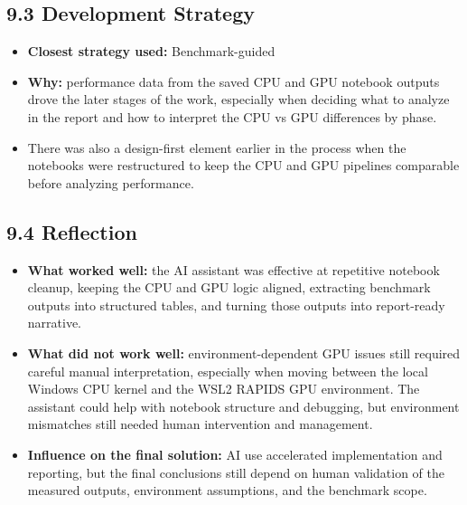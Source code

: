 \documentclass[10pt]{article}
\begin{document}
\subsection*{9.3 Development Strategy}
\begin{itemize}
  \item \textbf{Closest strategy used:} Benchmark-guided
  \item \textbf{Why:} performance data from the saved CPU and GPU notebook outputs drove the later stages of the work, especially when deciding what to analyze in the report and how to interpret the CPU vs GPU differences by phase.
  \item There was also a design-first element earlier in the process when the notebooks were restructured to keep the CPU and GPU pipelines comparable before analyzing performance.
\end{itemize}

\subsection*{9.4 Reflection}
\begin{itemize}
  \item \textbf{What worked well:} the AI assistant was effective at repetitive notebook cleanup, keeping the CPU and GPU logic aligned, extracting benchmark outputs into structured tables, and turning those outputs into report-ready narrative.
  \item \textbf{What did not work well:} environment-dependent GPU issues still required careful manual interpretation, especially when moving between the local Windows CPU kernel and the WSL2 RAPIDS GPU environment. The assistant could help with notebook structure and debugging, but environment mismatches still needed human intervention and management.
  \item \textbf{Influence on the final solution:} AI use accelerated implementation and reporting, but the final conclusions still depend on human validation of the measured outputs, environment assumptions, and the benchmark scope.
\end{itemize}
\end{document}
